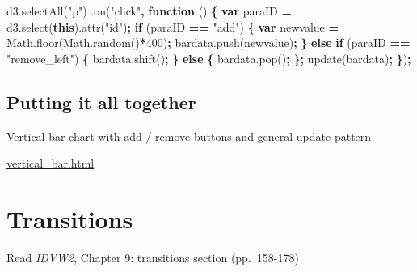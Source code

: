 \documentclass[openany]{book}
\newenvironment{Shaded}{\begin{snugshade}}{\end{snugshade}}
\newcommand{\AttributeTok}[1]{\textcolor[rgb]{0.77,0.63,0.00}{#1}}
\newcommand{\ControlFlowTok}[1]{\textcolor[rgb]{0.13,0.29,0.53}{\textbf{#1}}}
\newcommand{\DecValTok}[1]{\textcolor[rgb]{0.00,0.00,0.81}{#1}}
\newcommand{\KeywordTok}[1]{\textcolor[rgb]{0.13,0.29,0.53}{\textbf{#1}}}
\newcommand{\NormalTok}[1]{#1}
\newcommand{\OperatorTok}[1]{\textcolor[rgb]{0.81,0.36,0.00}{\textbf{#1}}}
\newcommand{\StringTok}[1]{\textcolor[rgb]{0.31,0.60,0.02}{#1}}
\newcommand{\VariableTok}[1]{\textcolor[rgb]{0.00,0.00,0.00}{#1}}
\begin{document}
\begin{Shaded}
\begin{Highlighting}[]
\VariableTok{d3}\NormalTok{.}\AttributeTok{selectAll}\NormalTok{(}\StringTok{"p"}\NormalTok{)}
\NormalTok{    .}\AttributeTok{on}\NormalTok{(}\StringTok{"click"}\OperatorTok{,} \KeywordTok{function}\NormalTok{ () }\OperatorTok{\{}
      \KeywordTok{var}\NormalTok{ paraID }\OperatorTok{=} \VariableTok{d3}\NormalTok{.}\AttributeTok{select}\NormalTok{(}\KeywordTok{this}\NormalTok{).}\AttributeTok{attr}\NormalTok{(}\StringTok{"id"}\NormalTok{)}\OperatorTok{;}
      \ControlFlowTok{if}\NormalTok{ (paraID }\OperatorTok{==} \StringTok{"add"}\NormalTok{) }\OperatorTok{\{}
          \KeywordTok{var}\NormalTok{ newvalue }\OperatorTok{=} \VariableTok{Math}\NormalTok{.}\AttributeTok{floor}\NormalTok{(}\VariableTok{Math}\NormalTok{.}\AttributeTok{random}\NormalTok{()}\OperatorTok{*}\DecValTok{400}\NormalTok{)}\OperatorTok{;}
          \VariableTok{bardata}\NormalTok{.}\AttributeTok{push}\NormalTok{(newvalue)}\OperatorTok{;}
          \OperatorTok{\}} \ControlFlowTok{else} \ControlFlowTok{if}\NormalTok{ (paraID }\OperatorTok{==} \StringTok{"remove_left"}\NormalTok{) }\OperatorTok{\{}
          \VariableTok{bardata}\NormalTok{.}\AttributeTok{shift}\NormalTok{()}\OperatorTok{;}
          \OperatorTok{\}} \ControlFlowTok{else} \OperatorTok{\{}
          \VariableTok{bardata}\NormalTok{.}\AttributeTok{pop}\NormalTok{()}\OperatorTok{;}
          \OperatorTok{\};}
      \AttributeTok{update}\NormalTok{(bardata)}\OperatorTok{;}
      \OperatorTok{\}}\NormalTok{)}\OperatorTok{;}
\end{Highlighting}
\end{Shaded}

\hypertarget{putting-it-all-together}{%
\section{Putting it all together}\label{putting-it-all-together}}

Vertical bar chart with add / remove buttons and general update pattern

\href{code/vertical_bar.html}{vertical\_bar.html}

\hypertarget{transitions-1}{%
\chapter{Transitions }\label{transitions-1}}

Read \emph{IDVW2}, Chapter 9: transitions section (pp.~158-178)
\end{document}
